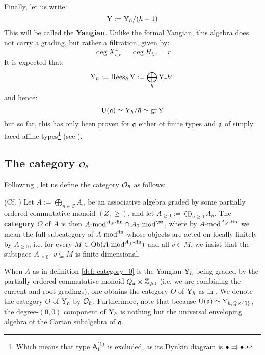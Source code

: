         Finally, let us write:
            $$\mathrm{Y} := \mathrm{Y}_{\hbar}/(\hbar - 1)$$
        This will be called the \textbf{Yangian}. Unlike the formal Yangian, this algebra does not carry a  grading, but rather a  filtration, given by:
            $$\deg X_{i, r}^{\pm} = \deg H_{i, r} = r$$
        It is expected that:
            $$\mathrm{Y}_{\hbar} := \operatorname{Rees}_{\hbar} \mathrm{Y} := \bigoplus_{\hbar} \mathrm{Y}_r \hbar^r$$
        and hence:
            $$\mathrm{U}(\mathfrak{a}) \simeq \mathrm{Y}_{\hbar}/\hbar \simeq \operatorname{gr} \mathrm{Y}$$
        but so far, this has only been proven for $\mathfrak{a}$ either of finite types and $\mathfrak{a}$ of simply laced affine types\footnote{Which means that type $\mathsf{A}_1^{(1)}$ is excluded, as its Dynkin diagram is $\bullet \rightrightarrows \bullet$.} (see \cite{guay_regelskis_wendlandt_affine_yangian_vertex_representations_and_PBW}).

    \subsection{The category \texorpdfstring{$\mathcal{O}_{\hbar}$}{}}
    
        Following \cite{weekes_phd_thesis_highest_weight_truncated_shifted_yangians}, let us define the category $\mathcal{O}_{\hbar}$ as follows:
        \begin{definition}[Category $O$] \label{def: category_0}
            (Cf. \cite[Definition 3.2.1]{weekes_phd_thesis_highest_weight_truncated_shifted_yangians}) Let $A := \bigoplus_{n \in Z} A_n$ be an associative algebra graded by some partially ordered commutative monoid $(Z, \geq)$, and let $A_{\geq 0} := \bigoplus_{n \geq 0} A_n$. The \textbf{category $O$} of $A$ is then $A\mod^{A_{\geq}\-\fin} \cap A_0\mod^{\ss}$, where by $A\text{-}\mathrm{mod}^{A_{\geqslant}\text{-}\mathrm{fin}}$ we mean the full subcategory of $A\text{-}\mathrm{mod}^{\mathrm{fin}}$ whose objects are acted on locally finitely by $A_{\geq 0}$, i.e. for every $M \in \mathrm{Ob}(A\text{-}\mathrm{mod}^{A_{\geqslant}\text{-}\mathrm{fin}})$ and all $v \in M$, we insist that the subspace $A_{\geq 0} \cdot v \subseteq M$ is finite-dimensional.
        \end{definition}
        When $A$ as in definition \ref{def: category_0} is the Yangian $\mathrm{Y}_{\hbar}$ being graded by the partially ordered commutative monoid $Q_{\a} \x \Z_{\geq 0}$ (i.e. we are combining the current and root gradings), one obtains the category $O$ of $\mathrm{Y}_{\hbar}$ as in \cite[Section 3]{guay_nakajima_wendlandt_affine_yangian_coproduct}. We denote the category $O$ of $\mathrm{Y}_{\hbar}$ by $\mathcal{O}_{\hbar}$. Furthermore, note that because $\rmU(\a) \cong \rmY_{\hbar, Q \x \{0\}}$, the degree-$(0, 0)$ component of $\mathrm{Y}_{\hbar}$ is nothing but the universal enveloping algebra of the Cartan subalgebra of $\mathfrak{a}$.

